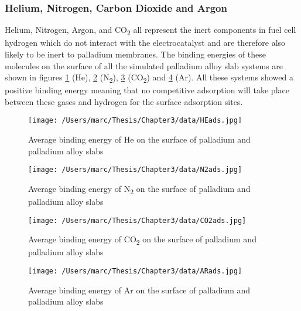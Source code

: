 \subsubsection{Helium, Nitrogen, Carbon Dioxide and Argon}
Helium, Nitrogen, Argon, and CO\textsubscript{2} all represent the inert components in fuel cell hydrogen which do not interact with the electrocatalyst and are therefore also likely to be inert to palladium membranes. The binding energies of these molecules on the surface of all the simulated palladium alloy slab systems are shown in figures \ref{heads} (He), \ref{n2ads} (N\textsubscript{2}), \ref{co2ads} (CO\textsubscript{2}) and \ref{Arads} (Ar). All these systems showed a positive binding energy meaning that no competitive adsorption will take place between these gases and hydrogen for the surface adsorption sites.

\begin{figure}
  \centering
  \texttt{[image: /Users/marc/Thesis/Chapter3/data/HEads.jpg]}
  \caption{Average binding energy of He on the surface of palladium and palladium alloy slabs}
  \label{heads}

\end{figure}

    \begin{figure}
        \centering
        \texttt{[image: /Users/marc/Thesis/Chapter3/data/N2ads.jpg]}
        \caption{Average binding energy of N\textsubscript{2} on the surface of palladium and palladium alloy slabs}
        \label{n2ads}
      \end{figure}

    \begin{figure}
        \centering
        \texttt{[image: /Users/marc/Thesis/Chapter3/data/CO2ads.jpg]}
        \caption{Average binding energy of CO\textsubscript{2} on the surface of palladium and palladium alloy slabs}
        \label{co2ads}
      \end{figure}
    
        \begin{figure}
            \centering
            \texttt{[image: /Users/marc/Thesis/Chapter3/data/ARads.jpg]}
            \caption{Average binding energy of Ar on the surface of palladium and palladium alloy slabs}
            \label{Arads}
          \end{figure}
        
